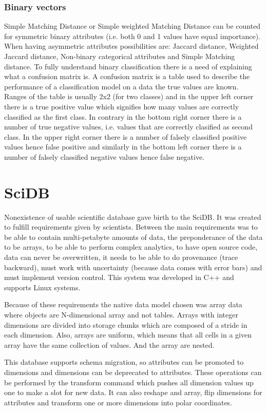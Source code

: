 \subsubsection{Binary vectors}
Simple Matching Distance or Simple weighted Matching Distance can be counted for symmetric binary attributes (i.e. both 0 and 1 values have equal importance).
When having asymmetric attributes possibilities are: Jaccard distance, Weighted Jaccard distance, Non-binary categorical attributes and Simple Matching distance.
To fully understand binary classification there is a need of explaining what a confusion matrix is. A confusion matrix is a table used to describe the performance of a classification model on a data the true values are known. Ranges of the table is usually 2x2 (for two classes) and in the upper left corner there is a true positive value which signifies how many values are correctly classified as the first class. In contrary in the bottom right corner there is a number of true negative values, i.e. values that are correctly clasified as second class. In the upper right corner there is a number of falsely classified positive values hence false positive and similarly in the bottom left corner there is a number of falsely classified negative values hence false negative.



\section{SciDB}
Nonexistence of usable scientific database gave birth to the SciDB. It was created to fulfill requirements given by scientists. Between the main requirements was to be able to contain multi-petabyte amounts of data, the preponderance of the data to be arrays, to be able to perform complex analytics, to have open source code, data can never be overwritten, it needs to be able to do provenance (trace backward), must work with uncertainty (because data comes with error bars) and must implement version control. This system was developed in C++ and supports Linux systems.

Because of these requirements the native data model chosen was array data where objects are N-dimensional array and not tables. Arrays with integer dimensions are divided into storage chunks which are composed of a stride in each dimension. Also, arrays are uniform, which means that all cells in a given array have the same collection of values. And the array are nested. \cite{scidb}

This database supports schema migration, so attributes can be promoted to dimensions and dimensions can be deprecated to attributes. These operations can be performed by the transform command which pushes all dimension values up one to make a slot for new data. It can also reshape and array, flip dimensions for attributes and transform one or more dimensions into polar coordinates.

